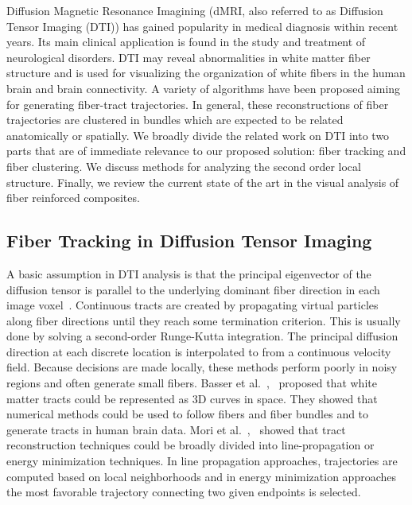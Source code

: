 Diffusion Magnetic Resonance Imagining (dMRI, also referred to as Diffusion Tensor Imaging (DTI)) has gained popularity in medical diagnosis within recent years. Its main clinical application is found in the study and treatment of neurological disorders. DTI may reveal abnormalities in white matter fiber structure and is used for visualizing the organization of white fibers in the human brain and  brain connectivity.
A variety of algorithms have been proposed aiming for generating fiber-tract trajectories. In general, these reconstructions of fiber trajectories are  clustered in bundles which are expected to be related anatomically or spatially. 
We broadly divide the related work on DTI into two parts that are of immediate relevance to our proposed solution: fiber tracking and fiber clustering. We discuss  methods for analyzing the second order local structure. Finally, we review the current state of the art in the visual analysis of fiber reinforced composites.


\subsection {Fiber Tracking in Diffusion Tensor Imaging}
\label{subsec:fiberEx} 
A basic assumption in DTI analysis is that the principal eigenvector of the diffusion tensor is parallel to the underlying dominant fiber direction in each image voxel~\cite{Basser2002, Basser2000, Mori1999, Mori2002}. Continuous tracts are created by propagating virtual particles along fiber directions until they reach some termination criterion. 
 This is usually done by solving a second-order Runge-Kutta integration. The principal diffusion direction at each discrete location is interpolated to from a continuous velocity field. 
 Because decisions are made locally, these methods perform poorly in noisy regions and often generate small fibers. Basser et al.~\cite{Basser2002},~\cite{Basser2000} proposed that white matter tracts could be represented as 3D curves in space. They showed that numerical methods could be used to follow fibers and fiber bundles and to generate tracts in human brain data. 
Mori et al.~\cite{Mori1999},~\cite{Mori2002} showed that tract reconstruction techniques could be broadly divided into line-propagation or energy minimization techniques. In line propagation approaches, trajectories are computed based on local neighborhoods and in energy minimization approaches the most  favorable trajectory connecting two given endpoints is selected. 


